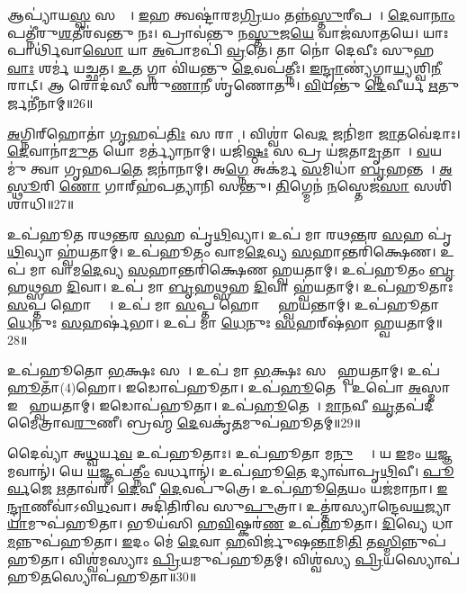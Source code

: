 𑌆𑌪𑍍𑌯𑌾॑𑌯\ul{𑌸𑍍𑌵} 𑌸𑌨𑍍𑌤𑍇᳚।
\ul{𑌇}𑌹 𑌤𑍍𑌵𑌷𑍍𑌟𑌾॑𑌰𑌮\ul{𑌗𑍍𑌰𑌿}𑌯𑌂 𑌤𑌨𑍍𑌨॑\ul{𑌸𑍍𑌤𑍁}𑌰𑍀𑌪𑌮𑍍᳚।
\ul{𑌦𑍇}𑌵𑌾\ul{𑌨𑌾𑌂} 𑌪𑌤𑍍𑌨𑍀॑𑌰𑍁\ul{𑌶}𑌤𑍀𑌰॑𑌵𑌨𑍍𑌤𑍁 𑌨𑌃।
𑌪𑍍𑌰𑌾𑌵॑𑌨𑍍𑌤𑍁 𑌨\ul{𑌸𑍍𑌤𑍁}𑌜\ul{𑌯𑍇} 𑌵𑌾𑌜॑𑌸𑌾𑌤𑌯𑍇।
𑌯𑌾𑌃 𑌪𑌾𑌰𑍍𑌥𑌿॑𑌵𑌾\ul{𑌸𑍋} 𑌯𑌾 \ul{𑌅}𑌪𑌾𑌮𑌪𑌿॑ \ul{𑌵𑍍𑌰}𑌤𑍇।
𑌤𑌾 𑌨𑍋॑ 𑌦𑍇𑌵𑍀𑌃 𑌸𑍁𑌹\ul{𑌵𑌾𑌃} 𑌶𑌰𑍍𑌮॑ 𑌯𑌚𑍍𑌛𑌤।
\ul{𑌉}𑌤 𑌗𑍍𑌨𑌾 𑌵𑌿॑𑌯𑌨𑍍𑌤𑍁 \ul{𑌦𑍇}𑌵𑌪॑𑌤𑍍𑌨𑍀𑌃।
\ul{𑌇}\ul{𑌨𑍍𑌦𑍍𑌰𑌾}𑌣𑍍𑌯॑𑌗𑍍𑌨𑌾\ul{𑌯𑍍𑌯}𑌶𑍍𑌵𑌿\ul{𑌨𑍀} 𑌰𑌾𑌟𑍍।
𑌆 𑌰𑍋𑌦॑𑌸𑍀 𑌵𑌰𑍁\ul{𑌣𑌾}𑌨𑍀 𑌶𑍃॑𑌣𑍋𑌤𑍁।
\ul{𑌵𑌿}𑌯𑌨𑍍𑌤𑍁॑ \ul{𑌦𑍇}𑌵𑍀𑌰𑍍𑌯 \ul{𑌋}𑌤𑍁𑌰𑍍𑌜𑌨𑍀॑𑌨𑌾𑌮𑍍॥26॥

\ul{𑌅}𑌗𑍍𑌨𑌿𑌰𑍍‌\mbox{}𑌹𑍋𑌤𑌾॑ \ul{𑌗𑍃}𑌹𑌪॑\ul{𑌤𑌿𑌃} 𑌸 𑌰𑌾𑌜𑌾᳚।
𑌵𑌿𑌶𑍍𑌵𑌾॑ 𑌵𑍇\ul{𑌦} 𑌜𑌨𑌿॑𑌮𑌾 \ul{𑌜𑌾}𑌤𑌵𑍇॑𑌦𑌾𑌃।
\ul{𑌦𑍇}𑌵𑌾𑌨𑌾॑\ul{𑌮𑍁}𑌤 𑌯𑍋 𑌮𑌰𑍍𑌤𑍍𑌯𑌾॑𑌨𑌾𑌮𑍍।
𑌯𑌜𑌿॑\ul{𑌷𑍍𑌠𑌃} 𑌸 𑌪𑍍𑌰 𑌯॑𑌜𑌤𑌾\ul{𑌮𑍃}𑌤𑌾𑌵𑌾᳚।
\ul{𑌵}𑌯𑌮𑍁॑ 𑌤𑍍𑌵𑌾 𑌗𑍃𑌹𑌪\ul{𑌤𑍇} 𑌜𑌨𑌾॑𑌨𑌾𑌮𑍍।
𑌅\ul{𑌗𑍍𑌨𑍇} 𑌅𑌕॑𑌰𑍍𑌮 \ul{𑌸}𑌮𑌿𑌧𑌾॑ \ul{𑌬𑍃}𑌹𑌨𑍍𑌤𑌮𑍍᳚।
\ul{𑌅}\ul{𑌸𑍍𑌥𑍂}𑌰𑌿 \ul{𑌣𑍋} 𑌗𑌾𑌰𑍍‌\mbox{}𑌹॑𑌪𑌤𑍍𑌯𑌾𑌨𑌿 𑌸𑌨𑍍𑌤𑍁।
\ul{𑌤𑌿}𑌗𑍍𑌮𑍇𑌨॑ \ul{𑌨}𑌸𑍍𑌤𑍇𑌜॑\ul{𑌸𑌾} 𑌸𑌶𑌿॑𑌶𑌾𑌧𑌿॥27॥\anuvakamend[𑌜𑌨𑍀॑𑌨𑌾\ul{𑌮}𑌷𑍍𑌟𑍗 𑌚॑]

𑌉𑌪॑𑌹𑍂𑌤 𑌰𑌥\ul{𑌨𑍍𑌤}𑌰 \ul{𑌸}𑌹 𑌪𑍃॑\ul{𑌥𑌿}𑌵𑍍𑌯𑌾।
𑌉𑌪॑ 𑌮𑌾 𑌰𑌥\ul{𑌨𑍍𑌤}𑌰 \ul{𑌸}𑌹 𑌪𑍃॑\ul{𑌥𑌿}𑌵𑍍𑌯𑌾 𑌹𑍍𑌵॑𑌯𑌤𑌾𑌮𑍍।
𑌉𑌪॑𑌹𑍂𑌤𑌂 𑌵𑌾𑌮\ul{𑌦𑍇}𑌵𑍍𑌯 \ul{𑌸}𑌹𑌾𑌨𑍍𑌤𑌰𑌿॑𑌕𑍍𑌷𑍇𑌣।
𑌉𑌪॑ 𑌮𑌾 𑌵𑌾𑌮\ul{𑌦𑍇}𑌵𑍍𑌯 \ul{𑌸}𑌹𑌾𑌨𑍍𑌤𑌰𑌿॑𑌕𑍍𑌷𑍇𑌣 𑌹𑍍𑌵𑌯𑌤𑌾𑌮𑍍।
𑌉𑌪॑𑌹𑍂𑌤𑌂 \ul{𑌬𑍃}𑌹\ul{𑌥𑍍𑌸}𑌹 \ul{𑌦𑌿}𑌵𑌾।
𑌉𑌪॑ 𑌮𑌾 \ul{𑌬𑍃}𑌹\ul{𑌥𑍍𑌸}𑌹 \ul{𑌦𑌿}𑌵𑌾 𑌹𑍍𑌵॑𑌯𑌤𑌾𑌮𑍍।
𑌉𑌪॑𑌹𑍂𑌤𑌾𑌃 \ul{𑌸}𑌪𑍍𑌤 𑌹𑍋𑌤𑍍𑌰𑌾𑌃᳚।
𑌉𑌪॑ 𑌮𑌾 \ul{𑌸}𑌪𑍍𑌤 𑌹𑍋𑌤𑍍𑌰𑌾᳚ 𑌹𑍍𑌵𑌯𑌨𑍍𑌤𑌾𑌮𑍍।
𑌉𑌪॑𑌹𑍂𑌤𑌾 \ul{𑌧𑍇}𑌨𑍁𑌃 \ul{𑌸}𑌹𑌰𑍍\mbox{}𑌷॑𑌭𑌾।
𑌉𑌪॑ 𑌮𑌾 \ul{𑌧𑍇}𑌨𑍁𑌃 \ul{𑌸}𑌹𑌰𑍍‌\mbox{}𑌷॑𑌭𑌾 𑌹𑍍𑌵𑌯𑌤𑌾𑌮𑍍॥28॥

𑌉𑌪॑𑌹𑍂𑌤𑍋 \ul{𑌭}𑌕𑍍𑌷𑌃 𑌸𑌖𑌾᳚।
𑌉𑌪॑ 𑌮𑌾 \ul{𑌭}𑌕𑍍𑌷𑌃 𑌸𑌖𑌾᳚ 𑌹𑍍𑌵𑌯𑌤𑌾𑌮𑍍।
𑌉𑌪॑\ul{𑌹𑍂}𑌤𑌾𑌁(4)𑌹𑍋।
𑌇𑌡𑍋𑌪॑𑌹𑍂𑌤𑌾।
𑌉𑌪॑\ul{𑌹𑍂}𑌤𑍇𑌡𑌾᳚।
𑌉𑌪𑍋॑ \ul{𑌅}𑌸𑍍𑌮𑌾 𑌇𑌡𑌾᳚ 𑌹𑍍𑌵𑌯𑌤𑌾𑌮𑍍।
𑌇𑌡𑍋𑌪॑𑌹𑍂𑌤𑌾।
𑌉𑌪॑\ul{𑌹𑍂}𑌤𑍇𑌡𑌾᳚।
\ul{𑌮𑌾}\ul{𑌨}𑌵𑍀 \ul{𑌘𑍃}𑌤𑌪॑𑌦𑍀 𑌮𑍈𑌤𑍍𑌰𑌾𑌵\ul{𑌰𑍁}𑌣𑍀।
𑌬𑍍𑌰𑌹𑍍𑌮॑ \ul{𑌦𑍇}𑌵𑌕𑍃॑\ul{𑌤}𑌮𑍁𑌪॑𑌹𑍂𑌤𑌮𑍍॥29॥

𑌦𑍈𑌵𑍍𑌯𑌾॑ 𑌅\ul{𑌧𑍍𑌵}𑌰𑍍𑌯\ul{𑌵} 𑌉𑌪॑𑌹𑍂𑌤𑌾𑌃।
𑌉𑌪॑𑌹𑍂𑌤𑌾 𑌮\ul{𑌨𑍁}𑌷𑍍𑌯𑌾𑌃᳚।
𑌯 \ul{𑌇}𑌮𑌂 \ul{𑌯}𑌜𑍍𑌞𑌮𑌵𑌾𑌨𑍍॑।
𑌯𑍇 \ul{𑌯}𑌜𑍍𑌞𑌪॑\ul{𑌤𑍍𑌨𑍀𑌂} 𑌵𑌰𑍍𑌧𑌾𑌨𑍍॑।
𑌉𑌪॑𑌹𑍂\ul{𑌤𑍇} 𑌦𑍍𑌯𑌾𑌵𑌾॑𑌪𑍃\ul{𑌥𑌿}𑌵𑍀।
\ul{𑌪𑍂}\ul{𑌰𑍍𑌵}𑌜𑍇 \ul{𑌋}𑌤𑌾𑌵॑𑌰𑍀।
\ul{𑌦𑍇}𑌵𑍀 \ul{𑌦𑍇}𑌵𑌪𑍁॑𑌤𑍍𑌰𑍇।
𑌉𑌪॑𑌹𑍂\ul{𑌤𑍇}𑌯𑌂 𑌯𑌜॑𑌮𑌾𑌨𑌾।
\ul{𑌇}\ul{𑌨𑍍𑌦𑍍𑌰𑌾}𑌣𑍀𑌵𑌾॑\-𑌽𑌵𑌿\ul{𑌧}𑌵𑌾।
𑌅𑌦𑌿॑𑌤𑌿𑌰𑌿𑌵 𑌸𑍁\ul{𑌪𑍁}𑌤𑍍𑌰𑌾।
𑌉𑌤𑍍𑌤॑𑌰𑌸𑍍𑌯𑌾𑌨𑍍𑌦𑍇𑌵\ul{𑌯}𑌜𑍍𑌯𑌾\ul{𑌯𑌾}𑌮𑍁𑌪॑𑌹𑍂𑌤𑌾।
𑌭𑍂𑌯॑𑌸𑌿 𑌹\ul{𑌵𑌿}𑌷𑍍𑌕𑌰॑\ul{𑌣} 𑌉𑌪॑𑌹𑍂𑌤𑌾।
\ul{𑌦𑌿}𑌵𑍍𑌯𑍇 𑌧𑌾\ul{𑌮}𑌨𑍍𑌨𑍁𑌪॑𑌹𑍂𑌤𑌾।
\ul{𑌇}𑌦𑌂 𑌮𑍇॑ \ul{𑌦𑍇}𑌵𑌾 \ul{𑌹}𑌵𑌿𑌰𑍍𑌜𑍁॑𑌷\ul{𑌨𑍍𑌤𑌾}𑌮𑌿\ul{𑌤𑌿} 𑌤\ul{𑌸𑍍𑌮𑌿}𑌨𑍍𑌨𑍁𑌪॑𑌹𑍂𑌤𑌾।
𑌵𑌿𑌶𑍍𑌵॑𑌮𑌸𑍍𑌯𑌾𑌃 \ul{𑌪𑍍𑌰𑌿}𑌯𑌮𑍁𑌪॑𑌹𑍂𑌤𑌮𑍍।
𑌵𑌿𑌶𑍍𑌵॑𑌸𑍍𑌯 \ul{𑌪𑍍𑌰𑌿}𑌯𑌸𑍍𑌯𑍋𑌪॑𑌹𑍂\ul{𑌤}𑌸𑍍𑌯𑍋𑌪॑𑌹𑍂𑌤𑌾॥30॥




\clearpage
{}
\setcounter{anuvakam}{0}

